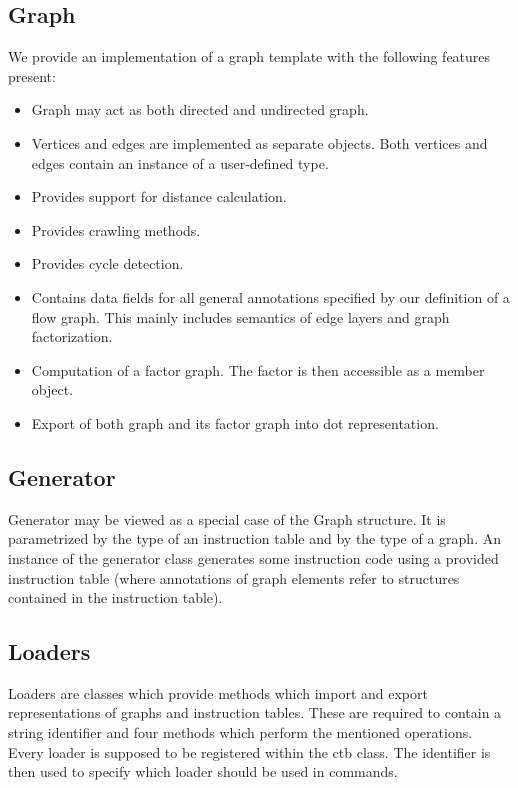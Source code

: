 \subsection*{Graph}

  We provide an implementation of a graph template with the following features present:

  \begin{itemize}
    \item Graph may act as both directed and undirected graph.
    \item Vertices and edges are implemented as separate objects. Both vertices and edges contain an instance of a user-defined type. 
    \item Provides support for distance calculation.
    \item Provides crawling methods.
    \item Provides cycle detection.
    \item Contains data fields for all general annotations specified by our definition of a flow graph. This mainly includes semantics of edge layers and graph factorization.
    \item Computation of a factor graph. The factor is then accessible as a member object.
    \item Export of both graph and its factor graph into dot representation. 
  \end{itemize}

\subsection*{Generator}
  Generator may be viewed as a special case of the Graph structure. It is parametrized by the type of an instruction table and by the type of a graph. An instance of the generator class generates some instruction code using a provided instruction table (where annotations of graph elements refer to structures contained in the instruction table). 

\subsection*{Loaders}
  Loaders are classes which provide methods which import and export representations of graphs and instruction tables. These are required to contain a string identifier and four methods which perform the mentioned operations. Every loader is supposed to be registered within the ctb class. The identifier is then used to specify which loader should be used in commands.

